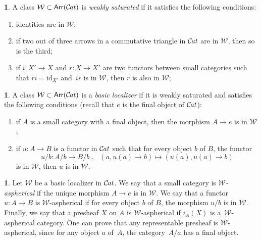 \documentclass[10pt, english, a4paper, nothms]{amsart}
\theoremstyle{plain}
\theoremstyle{remark}
\theoremstyle{definition}
\newtheorem{paragr}[theorem]{}
\numberwithin{equation}{theorem}
\newcommand{\Cat}{{\mathcal{C}\mspace{-2.mu}\it{at}}}
\newcommand{\Arr}{\operatorname{\mathsf{Arr}}}
\newcommand{\id}{\mathrm{id}}
\newcommand{\tranche}[2]{#1/{#2}}
\newcommand{\W}{\mathcal{W}}
\newcommand{\mdvirg}{\text{ ,}\hspace{10pt}}
\begin{document}
\begin{paragr}
A class $\W \subset \Arr(\Cat)$ is \emph{weakly saturated} if it
satisfies the following conditions: 
\begin{enumerate}
\item identities are in $\W$;
\item if two out of three arrows in a commutative triangle in $\Cat$ are in
$\W$, then so is the third;
\item if $i: X' \to X$ and $r: X \to X'$ are two functors between small
categories such that $ri=\id_{X'}$ and~$ir$ is in $\W$, then $r$ is also in
$\W$;
\end{enumerate}
\end{paragr}
\begin{paragr}
A class $\W \subset \Arr(\Cat)$ is a \emph{basic localizer} if it is weakly
saturated and satisfies the following conditions (recall that $e$ is the final
object of $\Cat$): 
\begin{enumerate}[resume]
\item if $A$ is a small category with a final object, then the
morphism $A\to e$ is in $\W$;
\item if $u: A \to B$ is a functor in $\Cat$ such that for every
object $b$ of $B$, the functor 
\[
\tranche{u}{b}: \tranche{A}{b} \to \tranche{B}{b} \mdvirg (a,u(a)\to b)
\mapsto (u(a),u(a)\to b) 
\]
is in $\W$, then $u$ is in $\W$. 
\end{enumerate}
\end{paragr}

\begin{paragr}
\label{par:defAspherique} 
Let $\W$ be a basic localizer in $\Cat$. We say that a small category
is \emph{$\W$-aspherical} if the unique morphism $A \to e$ is in $\W$. 
We say that a functor $u: A \to B$ is $\W$-aspherical if for every
object $b$ of $B$, the morphism $\tranche{u}{b}$ is in $\W$. Finally, we say
that a presheaf $X$ on $A$ is $\W$-aspherical if $i_A(X)$ is
a~$\W$-aspherical category. One can prove that any representable presheaf is $
\W$-aspherical, since for any object $a$ of~$A$, the
category~$\tranche{A}{a}$ has a final object.
\end{paragr}
\end{document}
